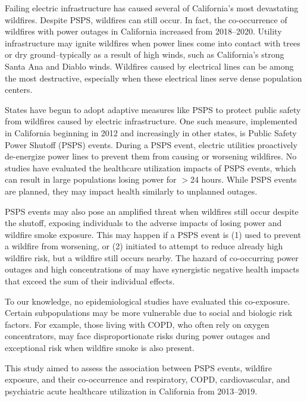 \documentclass[../main.tex]{subfiles}
\begin{document}
Failing electric infrastructure has caused several of California's most devastating wildfires. Despite PSPS, wildfires can still occur. In fact, the co-occurrence of wildfires with power outages in California increased from 2018--2020.\citep{do2025spatiotemporal}  Utility infrastructure may ignite wildfires when power lines come into contact with trees or dry ground--typically as a result of high winds, such as California's strong Santa Ana and Diablo winds.\citep{khan2022probabilistic} Wildfires caused by electrical lines can be among the most destructive,\citep{harding2025a} especially when these electrical lines serve dense population centers. 

States have begun to adopt adaptive measures like PSPS to protect public safety from wildfires caused by electric infrastructure. One such measure, implemented in California beginning in 2012 and increasingly in other states, is Public Safety Power Shutoff (PSPS) events.\citep{cpuc_psps_2025, PSEHealthyEnergy_PSPS} During a PSPS event, electric utilities proactively de-energize power lines to prevent them from causing or worsening wildfires.\citep{cpuc_psps_2025} No studies have evaluated the healthcare utilization impacts of PSPS events, which can result in large populations losing power for $>$24 hours. While PSPS events are planned, they may impact health similarly to unplanned outages. 

PSPS events may also pose an amplified threat when wildfires still occur despite the shutoff, exposing individuals to the adverse impacts of losing power and wildfire smoke exposure. This may happen if a PSPS event is (1) used to prevent a wildfire from worsening, or (2) initiated to attempt to reduce already high wildfire risk, but a wildfire still occurs nearby. The hazard of co-occurring power outages and high concentrations of \PM may have synergistic negative health impacts that exceed the sum of their individual effects. 
 
To our knowledge, no epidemiological studies have evaluated this co-exposure. Certain subpopulations may be more vulnerable due to social and biologic risk factors. For example, those living with COPD, who often rely on oxygen concentrators, may face disproportionate risks during power outages and exceptional risk when wildfire smoke is also present. 

This study aimed to assess the association between PSPS events, wildfire \PM exposure, and their co-occurrence and respiratory, COPD, cardiovascular, and psychiatric acute healthcare utilization in California from 2013--2019.

\bigskip
\bigskip
\end{document}

